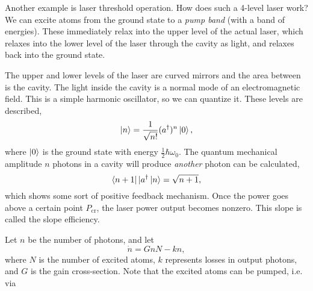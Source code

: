 \documentclass{article}
\numberwithin{equation}{section}
\begin{document}
\begin{example}
    Another example is laser threshold operation. How does such a 4-level laser work? We can excite atoms from the ground state to a \textit{pump band} (with a band of energies). These immediately relax into the upper level of the actual laser, which relaxes into the lower level of the laser through the cavity as light, and relaxes back into the ground state.
    \vspace{2mm}

    The upper and lower levels of the laser are curved mirrors and the area between is the cavity. The light inside the cavity is a normal mode of an electromagnetic field. This is a simple harmonic oscillator, so we can quantize it. These levels are described,
    \begin{equation*}
        \ket{n} = \frac{1}{\sqrt{n!}} (a^\dagger)^n \ket{0},
    \end{equation*}
    where $\ket{0}$ is the ground state with energy $\frac{1}{2}\hbar\omega_0.$ The quantum mechanical amplitude $n$ photons in a cavity will produce \textit{another} photon can be calculated,
    \begin{equation*}
        \bra{n+1}|a^\dagger\ket{n} = \sqrt{n+1},
    \end{equation*}
    which shows some sort of positive feedback mechanism. Once the power goes above a certain point $P_\text{cr}$, the laser power output becomes nonzero. This slope is called the slope efficiency.
    \begin{center}
    \end{center}
    Let $n$ be the number of photons, and let 
    \begin{equation*}
        \dot{n} = GnN - kn,
    \end{equation*}
    where $N$ is the number of excited atoms, $k$ represents losses in output photons, and $G$ is the gain cross-section. Note that the excited atoms can be pumped, i.e. via

\end{example}
\end{document}
